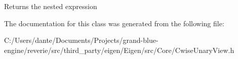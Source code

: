 \begin{DoxyReturn}{Returns}
the nested expression 
\end{DoxyReturn}


The documentation for this class was generated from the following file\+:\begin{DoxyCompactItemize}
\item 
C\+:/\+Users/dante/\+Documents/\+Projects/grand-\/blue-\/engine/reverie/src/third\+\_\+party/eigen/\+Eigen/src/\+Core/Cwise\+Unary\+View.\+h\end{DoxyCompactItemize}
